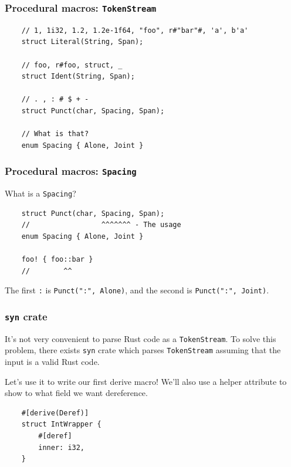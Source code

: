 \documentclass[aspectratio=1610,t]{beamer}
\begin{document}

\begin{frame}[fragile]
\frametitle{Procedural macros: \texttt{TokenStream}}
\begin{verbatim}
    // 1, 1i32, 1.2, 1.2e-1f64, "foo", r#"bar"#, 'a', b'a'
    struct Literal(String, Span);

    // foo, r#foo, struct, _
    struct Ident(String, Span);

    // . , : # $ + -
    struct Punct(char, Spacing, Span);

    // What is that?
    enum Spacing { Alone, Joint }
\end{verbatim}
\end{frame}


\begin{frame}[fragile]
\frametitle{Procedural macros: \texttt{Spacing}}
What is a \texttt{Spacing}?

\begin{verbatim}
    struct Punct(char, Spacing, Span);
    //                 ^^^^^^^ - The usage
    enum Spacing { Alone, Joint }

    foo! { foo::bar }
    //        ^^
\end{verbatim}

The first \texttt{:} is \texttt{Punct(":", Alone)}, and the second is \texttt{Punct(":", Joint)}.
\end{frame}


\begin{frame}[fragile]
\frametitle{\texttt{syn} crate}
It's not very convenient to parse Rust code as a \texttt{TokenStream}. To solve this problem, there exists \texttt{syn} crate which parses \texttt{TokenStream} assuming that the input is a valid Rust code.

Let's use it to write our first derive macro! We'll also use a helper attribute to show to what field we want dereference.

\begin{verbatim}
    #[derive(Deref)]
    struct IntWrapper {
        #[deref]
        inner: i32,
    }
\end{verbatim}
\end{frame}

\end{document}
